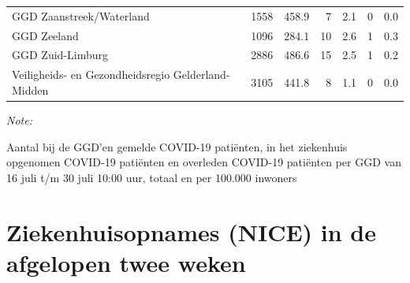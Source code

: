 \documentclass[
  english,
  man,floatsintext]{apa6}
\begin{document}
\begin{table}
\begin{threeparttable}
\begin{tabular}{lrrrrrr}
GGD Zaanstreek/Waterland & 1558 & 458.9 & 7 & 2.1 & 0 & 0.0\\
GGD Zeeland & 1096 & 284.1 & 10 & 2.6 & 1 & 0.3\\
GGD Zuid-Limburg & 2886 & 486.6 & 15 & 2.5 & 1 & 0.2\\
Veiligheids- en Gezondheidsregio Gelderland-Midden & 3105 & 441.8 & 8 & 1.1 & 0 & 0.0\\
\bottomrule
\end{tabular}
\begin{tablenotes}
\item \textit{Note: } 
\item Aantal bij de GGD’en gemelde COVID-19 patiënten, in het ziekenhuis opgenomen COVID-19 patiënten en overleden COVID-19 patiënten per GGD van 16 juli t/m 30 juli 10:00 uur, totaal en per 100.000 inwoners
\end{tablenotes}
\end{threeparttable}
\endgroup{}
\end{table}

\newpage

\hypertarget{ziekenhuisopnames-nice-in-de-afgelopen-twee-weken}{%
\section{Ziekenhuisopnames (NICE) in de afgelopen twee weken}\label{ziekenhuisopnames-nice-in-de-afgelopen-twee-weken}}
\end{document}
